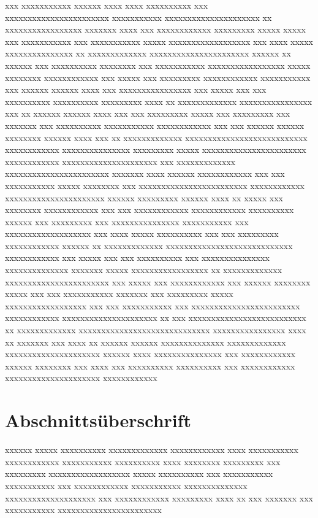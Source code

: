 \begin{introduction}
xxx xxxxxxxxxxx xxxxxx xxxx xxxx xxxxxxxxxx xxx xxxxxxxxxxxxxxxxxxxxxxx xxxxxxxxxxx xxxxxxxxxxxxxxxxxxxxx xx xxxxxxxxxxxxxxxxx xxxxxxx xxxx xxx xxxxxxxxxxxx xxxxxxxxx xxxxx xxxxx xxx xxxxxxxxxxx xxx xxxxxxxxxxx xxxxx xxxxxxxxxxxxxxxxxx xxx xxxx xxxxx xxxxxxxxxxxxxxx xx xxxxxxxxxxxxx xxxxxxxxxxxxxxxxxxxxxx xxxxxx xx xxxxxx xxx xxxxxxxxxx xxxxxxxx xxx xxxxxxxxxxx xxxxxxxxxxxxxxxxx xxxxx xxxxxxxx xxxxxxxxxxxx xxx xxxxx xxx xxxxxxxxx xxxxxxxxxxxx xxxxxxxxxxx xxx xxxxxx xxxxxx xxxx xxx xxxxxxxxxxxxxxxx xxx xxxxx xxx xxx xxxxxxxxxx xxxxxxxxxx xxxxxxxxx xxxx xx xxxxxxxxxxxxx xxxxxxxxxxxxxxxx xxx xx xxxxxx xxxxxx xxxx xxx xxx xxxxxxxxx xxxxx xxx xxxxxxxxx xxx xxxxxxx xxx xxxxxxxxxx xxxxxxxxxxx xxxxxxxxxxxx xxx xxx xxxxxx xxxxxx xxxxxxxx xxxxxx xxxx xxx xx xxxxxxxxxxxxx xxxxxxxxxxxxxxxxxxxxxxxxxxx xxxxxxxxxxxx xxxxxxxxxxxxxxx xxxxxxxxx xxxxx xxxxxxxxxxxxxxxxxxxxxxx xxxxxxxxxxxx xxxxxxxxxxxxxxxxxxxxx xxx xxxxxxxxxxxxx xxxxxxxxxxxxxxxxxxxxxxx xxxxxxx xxxx xxxxxx xxxxxxxxxxxx xxx xxx xxxxxxxxxxx xxxxx xxxxxxxx xxx xxxxxxxxxxxxxxxxxxxxxxxx xxxxxxxxxxxx xxxxxxxxxxxxxxxxxxxxxx xxxxxx xxxxxxxxx xxxxxx xxxx xx xxxxx xxx xxxxxxxx xxxxxxxxxxxx xxx xxx xxxxxxxxxxxx xxxxxxxxxxxx xxxxxxxxxx xxxxxx xxx xxxxxxxxx xxx xxxxxxxxxxxxxxx xxxxxxxxxxx xxx xxxxxxxxxxxxxxxxxxx xxx xxxx xxxxx xxxxxxxxxx xxx xxx xxxxxxxxx xxxxxxxxxxxx xxxxxx xx xxxxxxxxxxxxx xxxxxxxxxxxxxxxxxxxxxxxxxxxx xxxxxxxxxxxx xxx xxxxx xxx xxx xxxxxxxxxx xxx xxxxxxxxxxxxxxx xxxxxxxxxxxxxx xxxxxxx xxxxx xxxxxxxxxxxxxxxxx xx xxxxxxxxxxxxx xxxxxxxxxxxxxxxxxxxxxxx xxx xxxxx xxx xxxxxxxxxxxx xxx xxxxxx xxxxxxxx xxxxx xxx xxx xxxxxxxxxxx xxxxxxx xxx xxxxxxxxx xxxxx xxxxxxxxxxxxxxxxxx xxx xxx xxxxxxxxxxx xxx xxxxxxxxxxxxxxxxxxxxxxxx xxxxxxxxxxxx xxxxxxxxxxxxxxxxxxxxx xx xxx xxxxxxxxxxxxxxxxxxxxxxxxxx xx xxxxxxxxxxxxx xxxxxxxxxxxxxxxxxxxxxxxxxxxxx xxxxxxxxxxxxxxxx xxxx xx xxxxxxx xxx xxxx xx xxxxxx xxxxxx xxxxxxxxxxxxxx xxxxxxxxxxxxx xxxxxxxxxxxxxxxxxxxxx xxxxxx xxxx xxxxxxxxxxxxxxx xxx xxxxxxxxxxxx xxxxxx xxxxxxxx xxx xxxx xxx xxxxxxxxxx xxxxxxxxxx xxx xxxxxxxxxxxx xxxxxxxxxxxxxxxxxxxxx xxxxxxxxxxxx
\section{Abschnittsüberschrift}\label{sec:xxxxx}
xxxxxx xxxxx xxxxxxxxxx xxxxxxxxxxxxx xxxxxxxxxxxx xxxx xxxxxxxxxxx xxxxxxxxxxxx xxxxxxxxxxx xxxxxxxxxx xxxx xxxxxxxx xxxxxxxxx xxx xxxxxxxxx xxxxxxxxxxxxxxxxxx xxxxx xxxxxxxxxx xxx xxxxxxxxxxx xxxxxxxxxxx xxx xxxxxxxxxxxx xxxxxxxxxxx xxxxxxxxxxxxxx xxxxxxxxxxxxxxxxxxxx xxx xxxxxxxxxxxx xxxxxxxxx xxxx xx xxx xxxxxxx xxx xxxxxxxxxxx xxxxxxxxxxxxxxxxxxxxxxx


\end{introduction}
